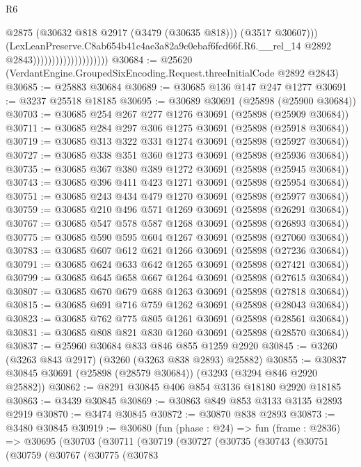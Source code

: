 \begin{lexlean}{R6}
\begin{coremodule}
                                              @2875
                                              (@30632 @818 @2917 (@3479 (@30635 @818)))
                                              (@3517 @30607)))
                                          (LexLeanPreserve.C8ab654b41c4ae3a82a9c0ebaf6fcd66f.R6.__rel_14
                                            @2892
                                            @2843))))))))))))))))))))
@30684 := @25620 (VerdantEngine.GroupedSixEncoding.Request.threeInitialCode @2892 @2843)
@30685 := @25883 @30684
@30689 := @30685 @136 @147 @247 @1277
@30691 := @3237 @25518 @18185
@30695 := @30689 @30691 (@25898 (@25900 @30684))
@30703 := @30685 @254 @267 @277 @1276 @30691 (@25898 (@25909 @30684))
@30711 := @30685 @284 @297 @306 @1275 @30691 (@25898 (@25918 @30684))
@30719 := @30685 @313 @322 @331 @1274 @30691 (@25898 (@25927 @30684))
@30727 := @30685 @338 @351 @360 @1273 @30691 (@25898 (@25936 @30684))
@30735 := @30685 @367 @380 @389 @1272 @30691 (@25898 (@25945 @30684))
@30743 := @30685 @396 @411 @423 @1271 @30691 (@25898 (@25954 @30684))
@30751 := @30685 @243 @434 @479 @1270 @30691 (@25898 (@25977 @30684))
@30759 := @30685 @210 @496 @571 @1269 @30691 (@25898 (@26291 @30684))
@30767 := @30685 @547 @578 @587 @1268 @30691 (@25898 (@26893 @30684))
@30775 := @30685 @590 @595 @604 @1267 @30691 (@25898 (@27060 @30684))
@30783 := @30685 @607 @612 @621 @1266 @30691 (@25898 (@27236 @30684))
@30791 := @30685 @624 @633 @642 @1265 @30691 (@25898 (@27421 @30684))
@30799 := @30685 @645 @658 @667 @1264 @30691 (@25898 (@27615 @30684))
@30807 := @30685 @670 @679 @688 @1263 @30691 (@25898 (@27818 @30684))
@30815 := @30685 @691 @716 @759 @1262 @30691 (@25898 (@28043 @30684))
@30823 := @30685 @762 @775 @805 @1261 @30691 (@25898 (@28561 @30684))
@30831 := @30685 @808 @821 @830 @1260 @30691 (@25898 (@28570 @30684))
@30837 := @25960 @30684 @833 @846 @855 @1259 @2920
@30845 := @3260 (@3263 @843 @2917) (@3260 (@3263 @838 @2893) @25882)
@30855 := @30837 @30845 @30691 (@25898 (@28579 @30684)) (@3293 (@3294 @846 @2920 @25882))
@30862 := @8291 @30845 @406 @854 @3136 @18180 @2920 @18185
@30863 := @3439 @30845
@30869 := @30863 @849 @853 @3133 @3135 @2893 @2919
@30870 := @3474 @30845
@30872 := @30870 @838 @2893
@30873 := @3480 @30845
@30919 := @30680
    (fun (phase : @24) =>
    fun (frame : @2836) =>
    @30695
      (@30703
        (@30711
          (@30719
            (@30727
              (@30735
                (@30743
                  (@30751
                    (@30759
                      (@30767
                        (@30775
                          (@30783

\end{coremodule}
\end{lexlean}
